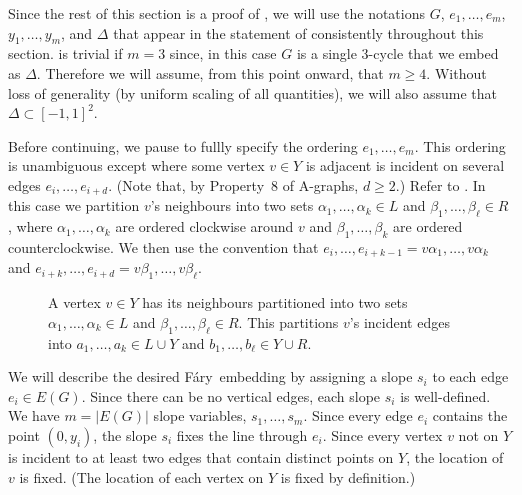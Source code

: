\documentclass{patmorin}
\newcommand{\Fary}{Fáry}
\begin{document}
Since the rest of this section is a proof of , we will
use the notations $G$, $e_1,\ldots,e_m$, $y_1,\ldots,y_m$, and $\Delta$
that appear in the statement of  consistently throughout
this section.   is trivial if $m=3$ since, in this
case $G$ is a single 3-cycle that we embed as $\Delta$. Therefore we
will assume, from this point onward, that $m\ge 4$.  Without loss of
generality (by uniform scaling of all quantities), we will also assume
that $\Delta\subset [-1,1]^2$.

Before continuing, we pause to fullly specify the ordering
$e_1,\ldots,e_m$. This ordering is unambiguous except where
some vertex $v\in Y$ is adjacent is incident on several edges
$e_{i},\ldots,e_{i+d}$. (Note that, by Property~8 of A-graphs, $d\ge 2$.)
Refer to .  In this case we partition $v$'s neighbours into two
sets $\alpha_1,\ldots,\alpha_k\in L$ and $\beta_1,\ldots,\beta_\ell\in
R$, where $\alpha_1,\ldots,\alpha_k$ are ordered clockwise around $v$
and $\beta_1,\ldots,\beta_k$ are ordered counterclockwise.  We then use
the convention that $e_i,\ldots,e_{i+k-1}=v\alpha_1,\ldots,v\alpha_k$
and $e_{i+k},\ldots,e_{i+d}=v\beta_1,\ldots,v\beta_\ell$.

\begin{figure}
     \caption{A vertex $v\in Y$ has its neighbours partitioned
       into two sets $\alpha_1,\ldots,\alpha_k\in L$ and
       $\beta_1,\ldots,\beta_\ell\in R$. This partitions $v$'s incident
       edges into $a_1,\ldots,a_k\in L\cup Y$ and $b_1,\ldots,b_\ell\in
       Y\cup R$.}
\end{figure}

We will describe the desired \Fary\ embedding by assigning a slope
$s_i$ to each edge $e_i\in E(G)$.  
Since there can be no vertical edges, each slope $s_i$ is well-defined.
We have $m=|E(G)|$ slope variables, $s_1,\ldots,s_m$.  Since every edge
$e_i$ contains the point $(0,y_i)$, the slope $s_i$
fixes the line through $e_i$.  Since every vertex $v$ not on $Y$ is
incident to at least two edges that contain distinct points on $Y$,
the location of $v$ is fixed.  (The location of each vertex on $Y$
is fixed by definition.)
\end{document}
